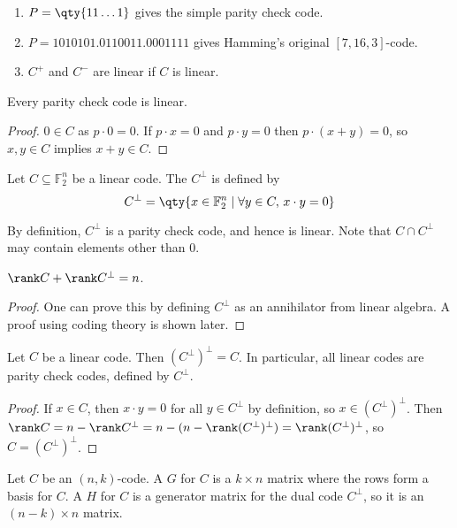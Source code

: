 \begin{example}
    \begin{enumerate}
        \item $P = \qty{11\dots 1}$ gives the simple parity check code.
        \item $P = \qty{1010101, 0110011, 0001111}$ gives Hamming's original $[7,16,3]$-code.
        \item $C^+$ and $C^-$ are linear if $C$ is linear.
    \end{enumerate}
\end{example}
\begin{lemma}
    Every parity check code is linear.
\end{lemma}
\begin{proof}
    $0 \in C$ as $p \cdot 0 = 0$.
    If $p \cdot x = 0$ and $p \cdot y = 0$ then $p \cdot (x + y) = 0$, so $x, y \in C$ implies $x + y \in C$.
\end{proof}
\begin{definition}
    Let $C \subseteq \mathbb F_2^n$ be a linear code.
    The  $C^\perp$ is defined by
    \[ C^\perp = \qty{x \in \mathbb F_2^n \mid \forall y \in C,\, x \cdot y = 0} \]
\end{definition}
By definition, $C^\perp$ is a parity check code, and hence is linear.
Note that $C \cap C^\perp$ may contain elements other than 0.
\begin{lemma}
    $\rank C + \rank C^\perp = n$.
\end{lemma}
\begin{proof}
    One can prove this by defining $C^\perp$ as an annihilator from linear algebra.
    A proof using coding theory is shown later.
\end{proof}
\begin{corollary}
    Let $C$ be a linear code.
    Then $(C^\perp)^\perp = C$.
    In particular, all linear codes are parity check codes, defined by $C^\perp$.
\end{corollary}
\begin{proof}
    If $x \in C$, then $x \cdot y = 0$ for all $y \in C^\perp$ by definition, so $x \in (C^\perp)^\perp$.
    Then $\rank C = n - \rank C^\perp = n - (n - \rank (C^\perp)^\perp) = \rank (C^\perp)^\perp$, so $C = (C^\perp)^\perp$.
\end{proof}
\begin{definition}
    Let $C$ be an $(n,k)$-code.
    A  $G$ for $C$ is a $k \times n$ matrix where the rows form a basis for $C$.
    A  $H$ for $C$ is a generator matrix for the dual code $C^\perp$, so it is an $(n-k) \times n$ matrix.
\end{definition}
